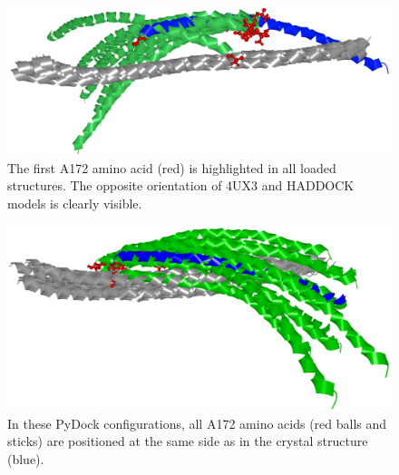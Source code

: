 \documentclass{bmcart}
\begin{document}
\begin{backmatter}
\begin{figure}[h!]
  \centering
  \includegraphics[width=0.9\columnwidth]{images/figure11.png}
  \caption{ The first A172 amino acid (red) is highlighted in all loaded structures. The opposite orientation of 4UX3 and HADDOCK models is clearly visible.}
  \label{fig:coiled_haddock}
\end{figure}

\begin{figure}[h!]
  \centering
  \includegraphics[width=0.9\columnwidth]{images/figure12.png}
  \caption{ In these PyDock configurations, all A172 amino acids (red balls and sticks) are positioned at the same side as in the crystal structure (blue).}
  \label{fig:selection2SMC3PyDock}
\end{figure}


\end{backmatter}
\end{document}
